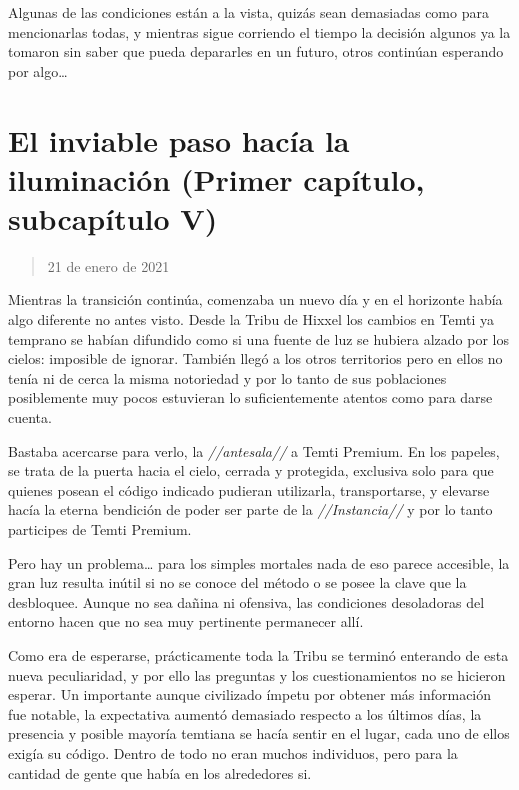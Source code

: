 \documentclass[
  spanish,
]{book}
\begin{document}
Algunas de las condiciones están a la vista, quizás sean demasiadas como para mencionarlas todas, y mientras sigue corriendo el tiempo la decisión algunos ya la tomaron sin saber que pueda depararles en un futuro, otros continúan esperando por algo\ldots{}

\hypertarget{el-inviable-paso-hacuxeda-la-iluminaciuxf3n-primer-capuxedtulo-subcapuxedtulo-v}{%
\section{El inviable paso hacía la iluminación (Primer capítulo, subcapítulo V)}\label{el-inviable-paso-hacuxeda-la-iluminaciuxf3n-primer-capuxedtulo-subcapuxedtulo-v}}

\begin{quote}
21 de enero de 2021
\end{quote}

Mientras la transición continúa, comenzaba un nuevo día y en el horizonte había algo diferente no antes visto. Desde la Tribu de Hixxel los cambios en Temti ya temprano se habían difundido como si una fuente de luz se hubiera alzado por los cielos: imposible de ignorar. También llegó a los otros territorios pero en ellos no tenía ni de cerca la misma notoriedad y por lo tanto de sus poblaciones posiblemente muy pocos estuvieran lo suficientemente atentos como para darse cuenta.

Bastaba acercarse para verlo, la \emph{//antesala//} a Temti Premium. En los papeles, se trata de la puerta hacia el cielo, cerrada y protegida, exclusiva solo para que quienes posean el código indicado pudieran utilizarla, transportarse, y elevarse hacía la eterna bendición de poder ser parte de la \emph{//Instancia//} y por lo tanto participes de Temti Premium.

Pero hay un problema\ldots{} para los simples mortales nada de eso parece accesible, la gran luz resulta inútil si no se conoce del método o se posee la clave que la desbloquee. Aunque no sea dañina ni ofensiva, las condiciones desoladoras del entorno hacen que no sea muy pertinente permanecer allí.

Como era de esperarse, prácticamente toda la Tribu se terminó enterando de esta nueva peculiaridad, y por ello las preguntas y los cuestionamientos no se hicieron esperar. Un importante aunque civilizado ímpetu por obtener más información fue notable, la expectativa aumentó demasiado respecto a los últimos días, la presencia y posible mayoría temtiana se hacía sentir en el lugar, cada uno de ellos exigía su código. Dentro de todo no eran muchos individuos, pero para la cantidad de gente que había en los alrededores si.
\end{document}
